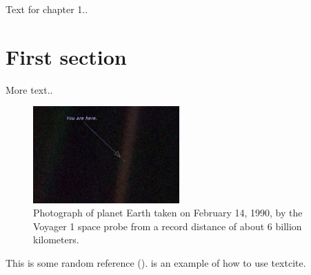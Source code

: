 
Text for chapter 1..

\section{First section }

More text..

\begin{figure}[h!]
    \centering
    \includegraphics[width=0.50\textwidth]{images/PaleBlueDot.png}
    \caption{Photograph of planet Earth taken on February 14, 1990, by the Voyager 1 space probe from a record distance of about 6 billion kilometers.}
    \label{fig: PaleBlueDot}    
\end{figure}

This is some random reference (\cite{sanchez2011introduction}). \textcite{parish2009propagation} is an example of how to use textcite.